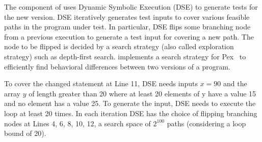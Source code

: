 The  component of  uses Dynamic Symbolic Execution (DSE) to generate tests for the new version. DSE iteratively generates test inputs to cover various feasible paths in the program under test. In particular, DSE flips some branching node from a previous execution to generate a test input for covering a new path. The node to be flipped is decided by a search strategy (also called exploration strategy) such as depth-first search.  implements a search strategy for Pex~\cite{Pex} to efficiently find behavioral differences between two versions of a program.

To cover the changed statement at Line 11, DSE needs inputs
$x=90$ and the array $y$ of length greater than 20 where at least 20 elements of y
have a value 15 and no element has a value 25. To generate the input, DSE needs to execute the loop at least 20 times. In each iteration DSE has the choice of flipping branching nodes at Lines 4, 6, 8, 10, 12, a search space of $2^{100}$ paths (considering a loop bound of 20). 
  
